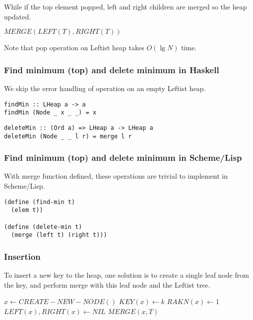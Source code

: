 \documentclass{article}
\begin{document}
While if the top element popped, left and right children are merged
so the heap updated.

\begin{algorithmic}[1]
  \State \Return $MERGE(LEFT(T), RIGHT(T))$
\EndFunction
\end{algorithmic}

Note that pop operation on Leftist heap takes $O(\lg N)$ time.

\subsubsection*{Find minimum (top) and delete minimum in Haskell}

We skip the error handling of operation on an empty 
Leftist heap.

\lstset{language=Haskell}
\begin{lstlisting}
findMin :: LHeap a -> a
findMin (Node _ x _ _) = x
\end{lstlisting}

\begin{lstlisting}
deleteMin :: (Ord a) => LHeap a -> LHeap a
deleteMin (Node _ _ l r) = merge l r
\end{lstlisting}

\subsubsection*{Find minimum (top) and delete minimum in Scheme/Lisp}

With merge function defined, these operations are trivial to implement
in Scheme/Lisp.

\lstset{language=lisp}
\begin{lstlisting}
(define (find-min t)
  (elem t))

(define (delete-min t)
  (merge (left t) (right t)))
\end{lstlisting}

\subsubsection{Insertion}

To insert a new key to the heap, one solution is to create a single
leaf node from the key, and perform merge with this leaf node and
the Leftist tree.

\begin{algorithmic}[1]
  \State $x \gets CREATE-NEW-NODE()$
  \State $KEY(x) \gets k$
  \State $RAKN(x) \gets 1$
  \State $LEFT(x), RIGHT(x) \gets NIL$
  \State \Return $MERGE(x, T)$
\EndFunction
\end{algorithmic}
\end{document}
